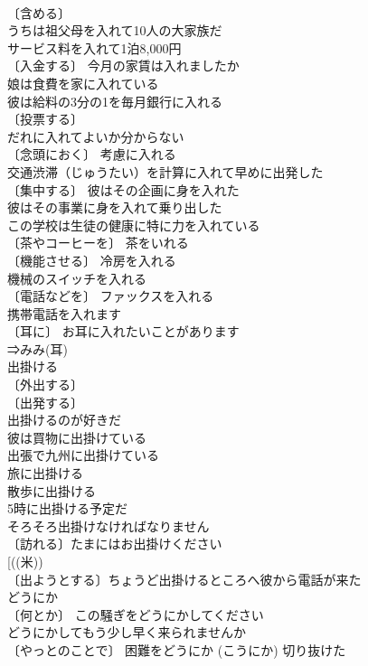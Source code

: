 \documentclass[8pt]{extreport}
\begin{document}
\begin{CJK}{UTF8}{min}
\\	〔含める〕
\\	うちは祖父母を入れて10人の大家族だ 
\\	サービス料を入れて1泊8,000円 
\\	〔入金する〕 今月の家賃は入れましたか 
\\	娘は食費を家に入れている 
\\	彼は給料の3分の1を毎月銀行に入れる 
\\	〔投票する〕
\\	だれに入れてよいか分からない 
\\	〔念頭におく〕 考慮に入れる 
\\	交通渋滞（じゅうたい）を計算に入れて早めに出発した 
\\	〔集中する〕 彼はその企画に身を入れた 
\\	彼はその事業に身を入れて乗り出した 
\\	この学校は生徒の健康に特に力を入れている 
\\	〔茶やコーヒーを〕 茶をいれる 
\\	〔機能させる〕 冷房を入れる 
\\	機械のスイッチを入れる 
\\	〔電話などを〕 ファックスを入れる 
\\	携帯電話を入れます 
\\	〔耳に〕 お耳に入れたいことがあります 
\\	⇒みみ(耳)
\\	出掛ける	
\\	〔外出する〕
\\	〔出発する〕
\\	出掛けるのが好きだ 
\\	彼は買物に出掛けている 
\\	出張で九州に出掛けている 
\\	旅に出掛ける 
\\	散歩に出掛ける 
\\	5時に出掛ける予定だ 
\\	そろそろ出掛けなければなりません 
\\	〔訪れる〕たまにはお出掛けください 
\\	[((米))
\\	〔出ようとする〕ちょうど出掛けるところへ彼から電話が来た 
\\	どうにか	
\\	〔何とか〕 この騒ぎをどうにかしてください 
\\	どうにかしてもう少し早く来られませんか 
\\	〔やっとのことで〕 困難をどうにか (こうにか) 切り抜けた 

\end{CJK}
\end{document}
